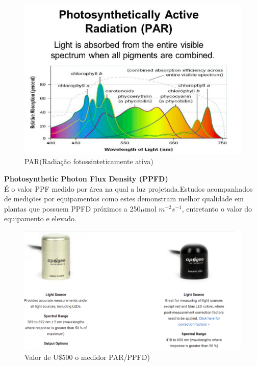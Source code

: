 \begin{figure}[H]
	\centering
	\includegraphics[width=15cm]{figuras/parGraphic.png}
	\caption{PAR(Radiação fotossinteticamente ativa)} \label{PAR}
\end{figure}

\textbf{Photosynthetic Photon Flux Density (PPFD)}\\
É o valor PPF medido por área na qual a luz projetada.Estudos acompanhados de medições por equipamentos como estes demonstram melhor qualidade em plantas que possuem PPFD  próximos a 250$\mu$mol $m^{-2}$$s^{-1}$, entretanto o valor do equipamento e elevado.

\begin{figure}[H]
	\centering
	\includegraphics[width=15cm]{figuras/valor_par.png}
	\caption{Valor de U\$500 o medidor PAR/PPFD)} \label{valor_par}
\end{figure}

